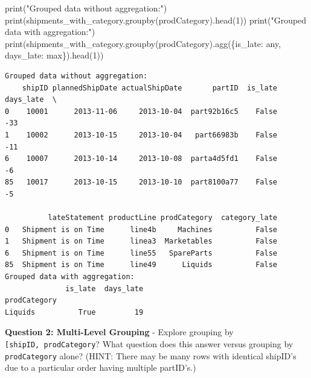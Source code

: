 \documentclass[
]{article}
\newenvironment{Shaded}{\begin{snugshade}}{\end{snugshade}}
\newcommand{\BuiltInTok}[1]{\textcolor[rgb]{0.00,0.23,0.31}{#1}}
\newcommand{\DecValTok}[1]{\textcolor[rgb]{0.68,0.00,0.00}{#1}}
\newcommand{\NormalTok}[1]{\textcolor[rgb]{0.00,0.23,0.31}{#1}}
\newcommand{\StringTok}[1]{\textcolor[rgb]{0.13,0.47,0.30}{#1}}
\begin{document}
\label{groupby-mechanics}
\begin{Shaded}
\begin{Highlighting}[]
\BuiltInTok{print}\NormalTok{(}\StringTok{"Grouped data without aggregation:"}\NormalTok{)}
\BuiltInTok{print}\NormalTok{(shipments\_with\_category.groupby(}\StringTok{\textquotesingle{}prodCategory\textquotesingle{}}\NormalTok{).head(}\DecValTok{1}\NormalTok{))}
\BuiltInTok{print}\NormalTok{(}\StringTok{"Grouped data with aggregation:"}\NormalTok{)}
\BuiltInTok{print}\NormalTok{(shipments\_with\_category.groupby(}\StringTok{\textquotesingle{}prodCategory\textquotesingle{}}\NormalTok{).agg(\{}\StringTok{\textquotesingle{}is\_late\textquotesingle{}}\NormalTok{: }\StringTok{\textquotesingle{}any\textquotesingle{}}\NormalTok{, }\StringTok{\textquotesingle{}days\_late\textquotesingle{}}\NormalTok{: }\StringTok{\textquotesingle{}max\textquotesingle{}}\NormalTok{\}).head(}\DecValTok{1}\NormalTok{))}
\end{Highlighting}
\end{Shaded}

\begin{verbatim}
Grouped data without aggregation:
    shipID plannedShipDate actualShipDate       partID  is_late  days_late  \
0    10001      2013-11-06     2013-10-04  part92b16c5    False        -33   
1    10002      2013-10-15     2013-10-04   part66983b    False        -11   
6    10007      2013-10-14     2013-10-08  parta4d5fd1    False         -6   
85   10017      2013-10-15     2013-10-10  part8100a77    False         -5   

          lateStatement productLine prodCategory  category_late  
0   Shipment is on Time      line4b     Machines          False  
1   Shipment is on Time      linea3  Marketables          False  
6   Shipment is on Time      line55   SpareParts          False  
85  Shipment is on Time      line49      Liquids          False  
Grouped data with aggregation:
              is_late  days_late
prodCategory                    
Liquids          True         19
\end{verbatim}

\textbf{Question 2: Multi-Level Grouping} - Explore grouping by
\texttt{{[}\textquotesingle{}shipID\textquotesingle{},\ \textquotesingle{}prodCategory\textquotesingle{}{]}}?
What question does this answer versus grouping by
\texttt{\textquotesingle{}prodCategory\textquotesingle{}} alone? (HINT:
There may be many rows with identical shipID's due to a particular order
having multiple partID's.)
\end{document}
